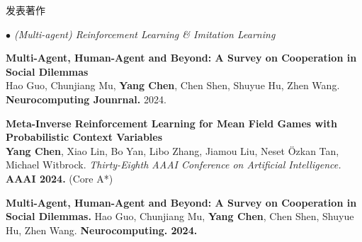\documentclass{resume} %
\begin{document}
\begin{rSection}{发表著作}
\begin{rSubsection}{\large\em $\bullet$ (Multi-agent) Reinforcement Learning \& Imitation Learning}{}{}{}
	\item {\bf Multi-Agent, Human-Agent and Beyond: A Survey on Cooperation in Social Dilemmas}\\
		Hao Guo, Chunjiang Mu, {\bf Yang Chen}, Chen Shen, Shuyue Hu, Zhen Wang. \textbf{Neurocomputing Jounrnal.} 2024.\\
	\item {\bf Meta-Inverse Reinforcement Learning for Mean Field Games with Probabilistic Context Variables}\\
		\textbf{\bf Yang Chen}, Xiao Lin, Bo Yan, Libo Zhang, Jiamou Liu, Neset \"{O}zkan Tan, Michael Witbrock. {\em Thirty-Eighth AAAI Conference on Artificial Intelligence.} \textbf{AAAI 2024.} (Core A*)\\
	\item {\bf Multi-Agent, Human-Agent and Beyond: A Survey on Cooperation in Social Dilemmas.} Hao Guo, Chunjiang Mu, \textbf{Yang Chen}, Chen Shen, Shuyue Hu, Zhen Wang. \textbf{Neurocomputing. 2024.}
	

\end{rSubsection}
\end{rSection}
\end{document}
